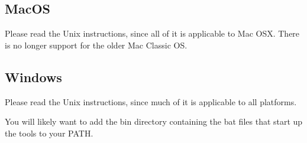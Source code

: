 \subsection{MacOS}

Please read the Unix instructions, since all of it is applicable to Mac OSX. There is no longer support 
for the older Mac Classic OS. 

\subsection{Windows}

Please read the Unix instructions, since much of it is applicable to all platforms.
 
You will likely want to add the bin directory containing the bat files that start up the 
tools to your PATH.
